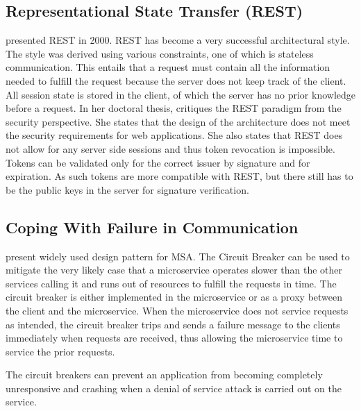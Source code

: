 \subsection{Representational State Transfer (REST)}
\begin{sloppypar}
    \citet{restroy} presented REST in 2000. REST has become a very successful
    architectural style. The style was derived using various constraints, one of
    which is stateless communication. This entails that a request must contain
    all the information needed to fulfill the request because the server does
    not keep track of the client. All session state is stored in the client, of
    which the server has no prior knowledge before a request. In her doctoral
    thesis, \citet{secchalmsa} critiques the REST paradigm from the security
    perspective. She states that the design of the architecture does not meet
    the security requirements for web applications. She also states that REST
    does not allow for any server side sessions and thus token revocation is
    impossible. Tokens can be validated only for the correct issuer by signature
    and for expiration. As such tokens are more compatible with REST, but there
    still has to be the public keys in the server for signature verification.
\end{sloppypar}

\subsection{Coping With Failure in Communication}
\begin{sloppypar}
    \citet{DBLP:journals/corr/MontesiW16} present widely used design pattern for
    MSA. The Circuit Breaker can be used to mitigate the very likely case that a
    microservice operates slower than the other services calling it and runs out
    of resources to fulfill the requests in time. The circuit breaker is either
    implemented in the microservice or as a proxy between the client and the
    microservice. When the microservice does not service requests as intended,
    the circuit breaker trips and sends a failure message to the clients
    immediately when requests are received, thus allowing the microservice time
    to service the prior requests.
\end{sloppypar}
\begin{sloppypar}
    The circuit breakers can prevent an application from becoming completely
    unresponsive and crashing when a denial of service attack is carried out on
    the service.
\end{sloppypar}


